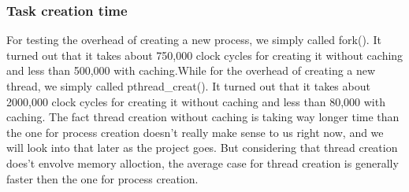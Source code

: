 \subsubsection{Task creation time}
For testing the overhead of creating a new process, we simply called fork(). It turned out that it takes about 750,000 clock cycles for creating it without caching and less than 500,000 with caching.While for the overhead of creating a new thread, we simply called pthread\_creat(). It turned out that it takes about 2000,000 clock cycles for creating it without caching and less than 80,000 with caching.
The fact thread creation without caching is taking way longer time than the one for process creation doesn't really make sense to us right now, and we will look into that later as the project goes. But considering that thread creation does't envolve memory alloction, the average case for thread creation is generally faster then the one for process creation.
